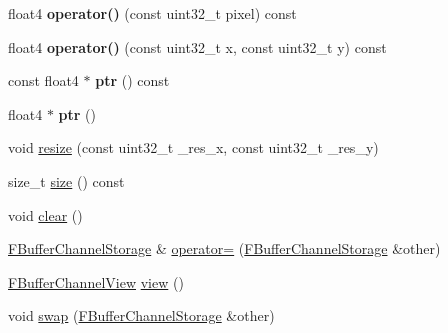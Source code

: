 \begin{DoxyCompactItemize}
\item 
\mbox{\label{struct_f_buffer_channel_storage_afc136c51ec78c859c6019ac4493ec884}} 
float4 {\bfseries operator()} (const uint32\+\_\+t pixel) const
\item 
\mbox{\label{struct_f_buffer_channel_storage_ad53a855e5bc7b04153f41f97bcf52bbf}} 
float4 {\bfseries operator()} (const uint32\+\_\+t x, const uint32\+\_\+t y) const
\item 
\mbox{\label{struct_f_buffer_channel_storage_a1ee9767232c6d6f85dcc0a2cc1b9fa05}} 
const float4 $\ast$ {\bfseries ptr} () const
\item 
\mbox{\label{struct_f_buffer_channel_storage_aefc013d6d0e2126fb99971fb71d6fc80}} 
float4 $\ast$ {\bfseries ptr} ()
\item 
void \hyperlink{struct_f_buffer_channel_storage_a183964cd1e00171df5eb4c2130db6c44}{resize} (const uint32\+\_\+t \+\_\+res\+\_\+x, const uint32\+\_\+t \+\_\+res\+\_\+y)
\item 
size\+\_\+t \hyperlink{struct_f_buffer_channel_storage_ace7afe67f49b4a628653dd42a5e39147}{size} () const
\item 
void \hyperlink{struct_f_buffer_channel_storage_a329a7a82c5c066eb4910cdf1694ae38c}{clear} ()
\item 
\hyperlink{struct_f_buffer_channel_storage}{F\+Buffer\+Channel\+Storage} \& \hyperlink{struct_f_buffer_channel_storage_a071ed06855db0e5fe595b6b7d8757fda}{operator=} (\hyperlink{struct_f_buffer_channel_storage}{F\+Buffer\+Channel\+Storage} \&other)
\item 
\hyperlink{struct_f_buffer_channel_view}{F\+Buffer\+Channel\+View} \hyperlink{struct_f_buffer_channel_storage_a1be90e5b134cb810c2497a66d2ac7b12}{view} ()
\item 
void \hyperlink{struct_f_buffer_channel_storage_adff7d04a3c7da747d662403c930c4074}{swap} (\hyperlink{struct_f_buffer_channel_storage}{F\+Buffer\+Channel\+Storage} \&other)
\end{DoxyCompactItemize}
